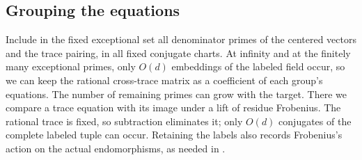 \subsection{Grouping the equations}

Include in the fixed exceptional set all denominator primes of the
centered vectors and the trace pairing, in all fixed conjugate charts.
At infinity and at the finitely many exceptional primes, only $O(d)$
embeddings of the labeled field occur, so we can keep the rational
cross-trace matrix as a coefficient of each group's equations.  The
number of remaining primes can grow with the target.  There we compare
a trace equation with its image under a lift of residue Frobenius.
The rational trace is fixed, so subtraction eliminates it; only $O(d)$
conjugates of the complete labeled tuple can occur.  Retaining the labels
also records Frobenius's action on the actual endomorphisms, as needed
in .

